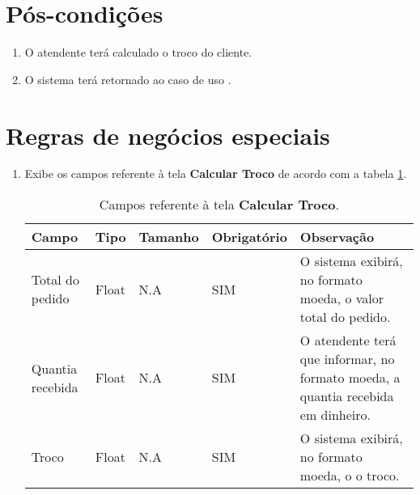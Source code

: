 \section{Pós-condições}

\begin{enumerate}
	\item O atendente terá calculado o troco do cliente.
	\item O sistema terá retornado ao caso de uso .	
\end{enumerate}

\section{Regras de negócios especiais}

\begin{enumerate}[label=RN\arabic*]
	\item Exibe os campos referente à tela \textbf{Calcular Troco} de acordo com a tabela \ref{uc008_tb_rn1}. \label{uc008_rn:1}
	\begin{table}[htb]
		\ABNTEXfontereduzida
		\caption[Campos referente à tela \textbf{Calcular Troco}]{Campos referente à tela \textbf{Calcular Troco}.}
		\label{uc008_tb_rn1}
		\begin{tabular}{|p{3.0cm}|p{2.0cm}|p{1.5cm}|p{2.0cm}|p{5.75cm}|}
			\hline
			\textbf{Campo}   & \textbf{Tipo} & \textbf{Tamanho} & \textbf{Obrigatório} & \textbf{Observação}                                                              \\ \hline
			Total do pedido  & Float         & N.A              & SIM                  & O sistema exibirá, no formato moeda, o valor total do pedido.                    \\ \hline
			Quantia recebida & Float         & N.A              & SIM                  & O atendente terá que informar, no formato moeda, a quantia recebida em dinheiro. \\ \hline
			Troco            & Float         & N.A              & SIM                  & O sistema exibirá, no formato moeda, o o troco.                                  \\ \hline
		\end{tabular}
	\end{table}
\end{enumerate}